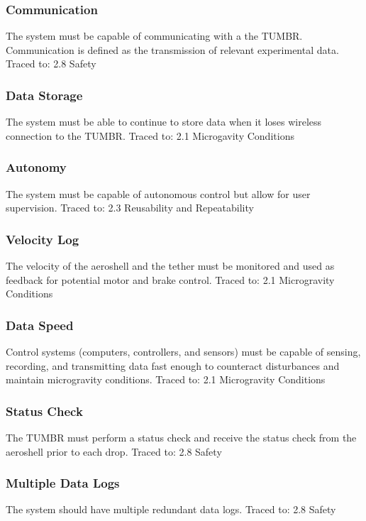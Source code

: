 \subsubsection*{Communication}
\indent\indent The system must be capable of communicating with a the TUMBR. Communication is defined as the transmission of relevant experimental data. Traced to: 2.8 Safety

\subsubsection*{Data Storage}
\indent\indent The system must be able to continue to store data when it loses wireless connection to the TUMBR. Traced to: 2.1 Microgavity Conditions

\subsubsection*{Autonomy}
\indent\indent The system must be capable of autonomous control but allow for user supervision. Traced to: 2.3 Reusability and Repeatability

\subsubsection*{Velocity Log}
\indent\indent The velocity of the aeroshell and the tether must be monitored and used as feedback for potential motor and brake control. Traced to: 2.1 Microgravity Conditions

\subsubsection*{Data Speed}
\indent\indent Control systems (computers, controllers, and sensors) must be capable of sensing, recording, and transmitting data fast enough to counteract disturbances and maintain microgravity conditions. Traced to: 2.1 Microgravity Conditions

\subsubsection*{Status Check}
\indent\indent The TUMBR must perform a status check and receive the status check from the aeroshell prior to each drop. Traced to: 2.8 Safety

\subsubsection*{Multiple Data Logs}
\indent\indent The system should have multiple redundant data logs. Traced to: 2.8 Safety

